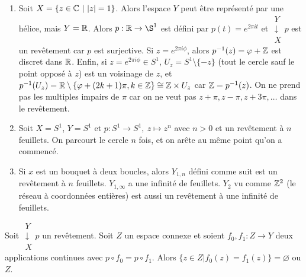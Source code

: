   
  \begin{exs}
    \begin{enumerate}
    \item Soit $X = \{z \in \mathbb{C}\ |\ |z| = 1 \}$. Alors l'espace $Y$ peut être représenté par une hélice, mais $Y
      = \mathbb{R}$. Alors $p: \R \to \S^1$ est défini par $p(t) = e^{2\pi i t}$ et $\substack{Y\\\downarrow\\ X}p$
      est un revêtement car $p$ est surjective. Si $z = e^{2\pi i \phi}$, alors $p^{-1}(z) = \varphi + \mathbb{Z}$ est
      discret dans $\mathbb{R}$. Enfin, si $z = e^{2 \pi i \phi} \in S^1$, $U_z = S^1 \setminus \{-z\}$ (tout le
      cercle sauf le point opposé à $z$) est un voisinage de $z$, et $p^{-1}(U_z) = \mathbb{R} \setminus \{\varphi +
      (2k+1)\pi, k \in \mathbb{Z}\} \cong \mathbb{Z} \times U_z$ car $\mathbb{Z} = p^{-1}(z)$. On ne prend pas les multiples impairs
      de $\pi$ car on ne veut pas $z+\pi, z-\pi, z+3\pi, \ldots$ dans le revêtement.

    \item Soit $X = S^1$, $Y = S^1$ et $p: S^1 \to S^1,\ z \mapsto z^n$ avec $n > 0$ et un revêtement à $n$
      feuillets. On parcourt le cercle $n$ fois, et on arête au même point qu'on a commencé.

    \item Si $x$ est un bouquet à deux boucles, alors $Y_{1,n}$ défini comme suit est un revêtement à $n$
      feuillets. $Y_{1, \infty}$ a une infinité de feuillets. $Y_2$ vu comme $\mathbb{Z}^2$ (le réseau à coordonnées
      entières) est aussi un revêtement à une infinité de feuillets.
    \end{enumerate}
  \end{exs}



  \begin{lem} \label{lem:lemme-A}
    Soit $\substack{Y\\\downarrow\\ X}p$ un revêtement. Soit $Z$ un espace connexe et soient $f_0, f_1 : Z
    \to Y$ deux applications continues avec $p \circ f_0 = p \circ f_1$. Alors $\{z \in Z | f_0(z) = f_1(z)\}
    = \varnothing$ ou $Z$.
    \begin{center}
    \end{center}
  \end{lem}


